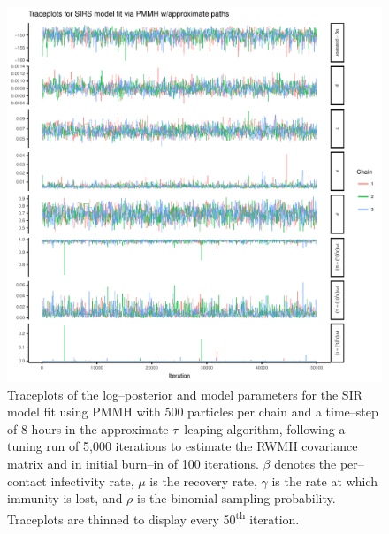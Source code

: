 \begin{figure}[htbp]
	\centering
	\includegraphics[width=0.9\linewidth]{figures/sirs_pomp_approx_traceplots}
	\caption[Simulation 1 MCMC traceplots for an SIRS model fit using PMMH with approximate particle paths with 500 particles per chain.]{Traceplots of the log--posterior and model parameters for the SIR model fit using PMMH with 500 particles per chain and a time--step of 8 hours in the approximate $ \tau $--leaping algorithm, following a tuning run of 5,000 iterations to estimate the RWMH covariance matrix and in initial burn--in of 100 iterations. $ \beta $ denotes the per--contact infectivity rate, $ \mu $ is the recovery rate, $\gamma$ is the rate at which immunity is lost, and $ \rho $ is the binomial sampling probability. Traceplots are thinned to display every 50\textsuperscript{th} iteration.}
	\label{fig:sirspompapproxtraceplots}
\end{figure}


